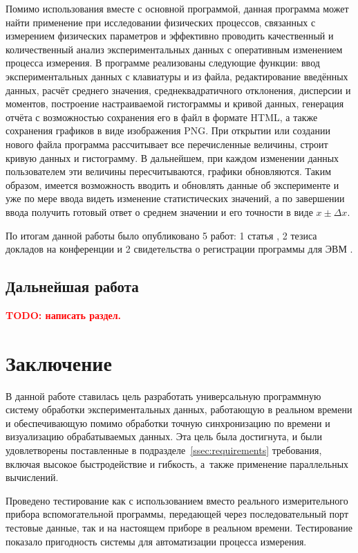 \documentclass[a4paper, 14pt, titlepage]{extarticle}
\newcommand\sectiontoc[1]{\section*{\centering #1}\addcontentsline{toc}{section}{#1}}
\newcommand{\todo}[1]{\textbf{\textcolor{red}{TODO: #1}}}
\let\oldsection\section
\renewcommand{\section}{\newpage\oldsection}
\begin{document}
  Помимо использования вместе с основной программой, данная программа может найти применение при
  исследовании физических процессов, связанных с измерением физических параметров и эффективно
  проводить качественный и количественный анализ экспериментальных данных с оперативным изменением
  процесса измерения. В программе реализованы следующие функции: ввод экспериментальных данных с
  клавиатуры и из файла, редактирование введённых данных, расчёт среднего значения,
  среднеквадратичного отклонения, дисперсии и моментов, построение настраиваемой гистограммы и кривой
  данных, генерация отчёта с возможностью сохранения его в файл в формате HTML, а также сохранения
  графиков в виде изображения PNG. При открытии или создании нового файла программа рассчитывает все
  перечисленные величины, строит кривую данных и гистограмму. В дальнейшем, при каждом
  изменении данных пользователем эти величины пересчитываются, графики обновляются. Таким образом,
  имеется возможность вводить и обновлять данные об эксперименте и уже по мере ввода видеть
  изменение статистических значений, а по завершении ввода получить готовый ответ о среднем значении
  и его точности в виде $x \pm \Delta x$.

  По итогам данной работы было опубликовано 5 работ: 1 статья \cite{nia-bogatov-13}, 2 тезиса
  докладов на конференции \cite{nia-sno-13, nia-tumaev-13} и 2 свидетельства о регистрации программы
  для ЭВМ \cite{nia-processdata}. %


  \subsection{Дальнейшая работа}
  \todo{написать раздел.}

  \sectiontoc{Заключение}

  В данной работе ставилась цель разработать универсальную программную систему обработки экспериментальных данных,
  работающую в реальном времени и обеспечивающую помимо обработки точную синхронизацию по времени и
  визуализацию обрабатываемых данных. Эта цель была достигнута, и были удовлетворены поставленные в
  подразделе~\ref{ssec:requirements} требования, включая высокое быстродействие и гибкость, а~также применение
  параллельных вычислений.

  Проведено тестирование как с использованием вместо реального измерительного прибора вспомогательной
  программы, передающей через последовательный порт тестовые данные, так и на настоящем приборе в
  реальном времени. Тестирование показало пригодность системы для автоматизации процесса измерения.
\end{document}
